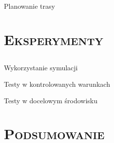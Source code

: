 \documentclass[xcolor=x11names,compress]{beamer}
\renewcommand{\(}{\begin{columns}}
\renewcommand{\)}{\end{columns}}
\newcommand{\<}[1]{\begin{column}{#1}}
\renewcommand{\>}{\end{column}}
\begin{document}
\begin{frame}{Planowanie trasy}

\end{frame}

\section{\scshape Eksperymenty}

\subsection*{}
\begin{frame}{Wykorzystanie symulacji}

\end{frame}

\begin{frame}{Testy w kontrolowanych warunkach}

\end{frame}

\begin{frame}{Testy w docelowym środowisku}

\end{frame}

\section{\scshape Podsumowanie}
\end{document}
